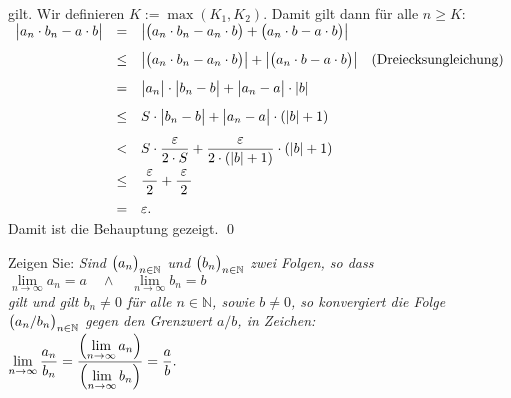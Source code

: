 \\[0.2cm]
gilt.  Wir definieren $K := \max(K_1,K_2)$.  Damit gilt dann f\"ur alle $n \geq K$:
\\[0.2cm]
\hspace*{1.3cm}
$
\begin{array}{lcll}
  \bigl| a_n \cdot  b_n - a \cdot  b \bigr|  
 & =    & \bigl| \bigl(a_n \cdot  b_n - a_n\cdot b \bigr) + \bigl(a_n\cdot b - a\cdot b\bigr) \bigr| \\[0.3cm]
 & \leq & \bigl| \bigl(a_n \cdot  b_n - a_n\cdot b \bigr) \bigr| + \bigl| \bigl(a_n\cdot b - a\cdot b\bigr) \bigr| 
        & \mbox{(Dreiecksungleichung)}  \\[0.3cm]
 & =    & \bigl|a_n\bigr| \cdot  \bigl| b_n - b \bigr| + \bigl| a_n - a \bigr| \cdot  |b| \\[0.3cm]
 & \leq & S \cdot  \bigl| b_n - b \bigr| + \bigl| a_n - a \bigr| \cdot  (|b| + 1) \\[0.3cm]
 & <    & \displaystyle S \cdot  \frac{\varepsilon}{2\cdot S} + \frac{\varepsilon}{2\cdot (|b| + 1)} \cdot  (|b| + 1)  \\[0.3cm]
 & \leq & \displaystyle\frac{\;\varepsilon\;}{2} + \frac{\;\varepsilon\;}{2}  \\[0.3cm]
 & =    & \varepsilon. 
\end{array}
$
\\[0.2cm]
Damit ist die Behauptung gezeigt. \qed


\exercise
Zeigen Sie:
{\em
Sind $\bigl(a_n\bigr)_{n\in\mathbb{N}}$ und $\bigl(b_n\bigr)_{n\in\mathbb{N}}$ zwei Folgen, so dass
\\[0.2cm]
\hspace*{1.3cm}
$ \lim\limits_{n\rightarrow\infty} a_n = a \quad \wedge \quad \lim\limits_{n\rightarrow\infty} b_n = b $
\\[0.2cm]
gilt und gilt $b_n \not= 0$ f\"ur alle $n \in \mathbb{N}$, sowie $b \not= 0$,
so konvergiert die Folge $\bigl(a_n/b_n\bigr)_{n\in\mathbb{N}}$ gegen den Grenzwert $a/b$, in
Zeichen:}
\\[0.2cm]
\hspace*{1.3cm}
$\displaystyle \lim\limits_{n\rightarrow\infty} \frac{a_n}{b_n} = 
   \frac{\Bigl(\lim\limits_{n\rightarrow\infty}
     a_n\Bigr)}{\Bigl(\lim\limits_{n\rightarrow\infty} b_n\Bigr)} =
   \frac{a}{b}.
$
\eox

